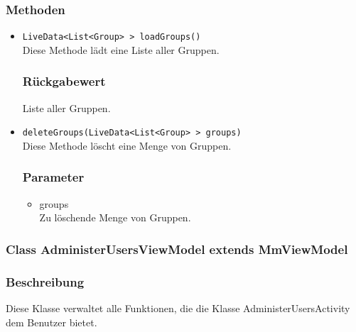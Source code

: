 \documentclass[a4paper]{scrreprt}
\begin{document}
\subsubsection*{Methoden}
\begin{addmargin}[25pt]{0pt}
\begin{itemize}

\item \texttt{LiveData<List<Group> > loadGroups()}\\
	Diese Methode lädt eine Liste aller Gruppen.

	\subsubsection*{Rückgabewert}
	Liste aller Gruppen.

\item \texttt{deleteGroups(LiveData<List<Group> > groups)}\\
	Diese Methode löscht eine Menge von Gruppen.
	\subsubsection*{Parameter}
	\begin{itemize}
	\item groups \\
		Zu löschende Menge von Gruppen.
	\end{itemize}

\end{itemize}
\end{addmargin}


\subsubsection{Class AdministerUsersViewModel extends MmViewModel}
\subsubsection*{Beschreibung}
Diese Klasse verwaltet alle Funktionen, die die Klasse AdministerUsersActivity dem Benutzer bietet.
\end{document}
